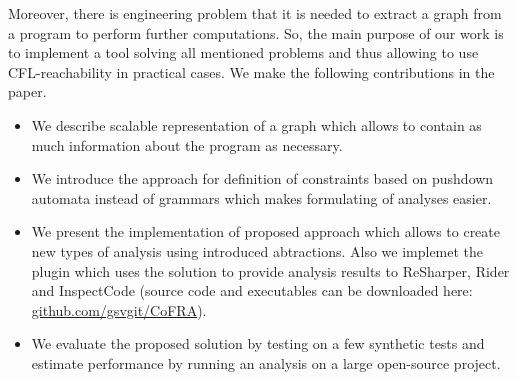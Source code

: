 Moreover, there is engineering problem that it is needed to extract a graph from a program to perform further computations.
So, the main purpose of our work is to implement a tool solving all mentioned problems and thus allowing to use CFL-reachability in practical cases.
 We make the following contributions in the paper.
\begin{itemize}
	\item We describe scalable representation of a graph which allows to contain as much information about the program as necessary.
	\item We introduce the approach for definition of constraints based on pushdown automata instead of grammars which makes formulating of analyses easier.
	\item We present the implementation of proposed approach which allows to create new types of analysis using introduced abtractions.
	Also we implemet the plugin which uses the solution to provide analysis results to ReSharper, Rider and InspectCode (source code and executables can be downloaded here: \url{github.com/gsvgit/CoFRA}).
	\item We evaluate the proposed solution by testing on a few synthetic tests and estimate performance by running an analysis on a large open-source project.
\end{itemize}

